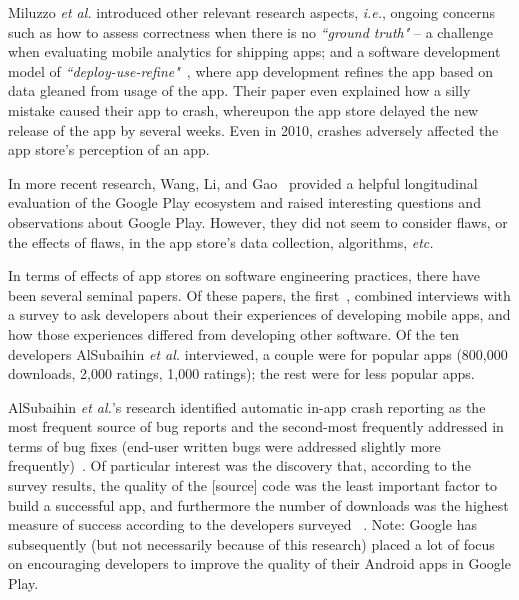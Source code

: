 Miluzzo \emph{et al.} introduced other relevant research aspects, \emph{i.e.}, ongoing concerns such as how to assess correctness when there is no \emph{``ground truth"} -- a challenge when evaluating mobile analytics for shipping apps; and a software development model of \emph{``deploy-use-refine"}~, where app development refines the app based on data gleaned from usage of the app. Their paper even explained how a silly mistake caused their app to crash, whereupon the app store delayed the new release of the app by several weeks. Even in 2010, crashes adversely affected the app store's perception of an app. %


In more recent research, Wang, Li, and Gao~ provided a helpful longitudinal evaluation of the Google Play ecosystem and raised interesting questions and observations about Google Play. However, they did not seem to consider flaws, or the effects of flaws, in the app store's data collection, algorithms,\emph{ etc.}

In terms of effects of app stores on software engineering practices, there have been several seminal papers. %
%
Of these papers, the first~, combined interviews with a survey to ask developers about their experiences of developing mobile apps, and how those experiences differed from developing other software. Of the ten developers AlSubaihin \emph{et al.} interviewed, a couple were for popular apps (800,000 downloads, 2,000 ratings, 1,000 ratings); the rest were for less popular apps. %

AlSubaihin \emph{et al.}'s research identified automatic in-app crash reporting as the most frequent source of bug reports and the second-most frequently addressed in terms of bug fixes (end-user written bugs were addressed slightly more frequently)~. 
Of particular interest was the discovery that, according to the survey results, the quality of the [source] code was the least important factor to build a successful app, and furthermore the number of downloads was the highest measure of success according to the developers surveyed ~. Note: Google has subsequently (but not necessarily because of this research)  placed a lot of focus on encouraging developers to improve the quality of their Android apps in Google Play. 

